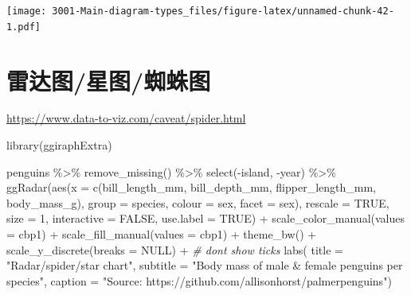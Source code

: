 \documentclass[
]{book}
\newenvironment{Shaded}{\begin{snugshade}}{\end{snugshade}}
\newcommand{\AttributeTok}[1]{\textcolor[rgb]{0.77,0.63,0.00}{#1}}
\newcommand{\CommentTok}[1]{\textcolor[rgb]{0.56,0.35,0.01}{\textit{#1}}}
\newcommand{\ConstantTok}[1]{\textcolor[rgb]{0.00,0.00,0.00}{#1}}
\newcommand{\DecValTok}[1]{\textcolor[rgb]{0.00,0.00,0.81}{#1}}
\newcommand{\FunctionTok}[1]{\textcolor[rgb]{0.00,0.00,0.00}{#1}}
\newcommand{\NormalTok}[1]{#1}
\newcommand{\SpecialCharTok}[1]{\textcolor[rgb]{0.00,0.00,0.00}{#1}}
\newcommand{\StringTok}[1]{\textcolor[rgb]{0.31,0.60,0.02}{#1}}
\begin{document}
\texttt{[image: 3001-Main-diagram-types\_files/figure-latex/unnamed-chunk-42-1.pdf]}

\hypertarget{ux96f7ux8fbeux56feux661fux56feux8718ux86dbux56fe}{%
\section{雷达图/星图/蜘蛛图}\label{ux96f7ux8fbeux56feux661fux56feux8718ux86dbux56fe}}

\url{https://www.data-to-viz.com/caveat/spider.html}

\begin{Shaded}
\begin{Highlighting}[]
\FunctionTok{library}\NormalTok{(ggiraphExtra)}
\end{Highlighting}
\end{Shaded}

\begin{Shaded}
\begin{Highlighting}[]
\NormalTok{penguins }\SpecialCharTok{\%\textgreater{}\%}
    \FunctionTok{remove\_missing}\NormalTok{() }\SpecialCharTok{\%\textgreater{}\%}
    \FunctionTok{select}\NormalTok{(}\SpecialCharTok{{-}}\NormalTok{island, }\SpecialCharTok{{-}}\NormalTok{year) }\SpecialCharTok{\%\textgreater{}\%}
    \FunctionTok{ggRadar}\NormalTok{(}\FunctionTok{aes}\NormalTok{(}\AttributeTok{x =} \FunctionTok{c}\NormalTok{(bill\_length\_mm, bill\_depth\_mm, flipper\_length\_mm, body\_mass\_g), }
                \AttributeTok{group =}\NormalTok{ species,}
                \AttributeTok{colour =}\NormalTok{ sex, }\AttributeTok{facet =}\NormalTok{ sex), }
            \AttributeTok{rescale =} \ConstantTok{TRUE}\NormalTok{, }
            \AttributeTok{size =} \DecValTok{1}\NormalTok{, }\AttributeTok{interactive =} \ConstantTok{FALSE}\NormalTok{, }
            \AttributeTok{use.label =} \ConstantTok{TRUE}\NormalTok{) }\SpecialCharTok{+}
     \FunctionTok{scale\_color\_manual}\NormalTok{(}\AttributeTok{values =}\NormalTok{ cbp1) }\SpecialCharTok{+}
  \FunctionTok{scale\_fill\_manual}\NormalTok{(}\AttributeTok{values =}\NormalTok{ cbp1) }\SpecialCharTok{+}
  \FunctionTok{theme\_bw}\NormalTok{() }\SpecialCharTok{+}
     \FunctionTok{scale\_y\_discrete}\NormalTok{(}\AttributeTok{breaks =} \ConstantTok{NULL}\NormalTok{) }\SpecialCharTok{+} \CommentTok{\# don\textquotesingle{}t show ticks}
      \FunctionTok{labs}\NormalTok{(}
          \AttributeTok{title =} \StringTok{"Radar/spider/star chart"}\NormalTok{, }
          \AttributeTok{subtitle =} \StringTok{"Body mass of male \& female penguins per species"}\NormalTok{,}
          \AttributeTok{caption =} \StringTok{"Source: https://github.com/allisonhorst/palmerpenguins"}\NormalTok{)}
\end{Highlighting}
\end{Shaded}
\end{document}
